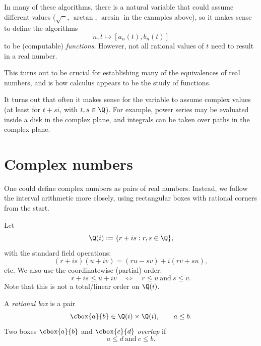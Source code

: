 \begin{remark}\label{rem:parameterized-constructions}
In many of these algorithms, there is a natural variable that could assume
different values (\(\sqrt{\phantom{x}}\), \(\arctan\), \(\arcsin\) in the
examples above), so it makes sense to define the algorithms
\[
  n,t\longmapsto [a_n(t),b_n(t)]
\]
to be (computable) \emph{functions}. However, not all rational values of \(t\)
need to result in a real number.

This turns out to be crucial for establishing many of the equivalences of real
numbers, and is how calculus appears to be the study of functions.
\end{remark}

\begin{remark}\label{rem:complex-parameters}
It turns out that often it makes sense for the variable to assume complex values
(at least for \(t+si\), with \(t,s\in\Q\)).  For example, power series may be evaluated
inside a disk in the complex plane, and integrals can be taken over paths in the complex plane.
\end{remark}

\section{Complex numbers \humanchecked}

One could define complex numbers as pairs of real numbers.  Instead, we follow
the interval arithmetic more closely, using rectangular boxes with rational corners
from the start.

\begin{definition}[Field \(\Q(i)\)]\label{def:qcomplex}
Let
\[
  \Q(i):=\{r+is:r,s\in\Q\},
\]
with the standard field operations:
\[
  (r+is)(u+iv)=(ru-sv)+i(rv+su),
\]
etc. We also use the coordinatewise (partial) order:
\[
  r+is \le u+iv
  \quad\Longleftrightarrow\quad
  r\le u\ \text{and}\ s\le v.
\]
Note that this is not a total/linear order on \(\Q(i)\).
\end{definition}

\begin{definition}\label{def:qbox}
A \emph{rational box} is a pair
\[
  \cbox{a}{b}\in \Q(i)\times\Q(i),
  \qquad a\le b.
\]
Two boxes \(\cbox{a}{b}\) and
\(\cbox{c}{d}\) \emph{overlap} if
\[
  a\le d\ \text{and}\ c\le b.
\]
\end{definition}

